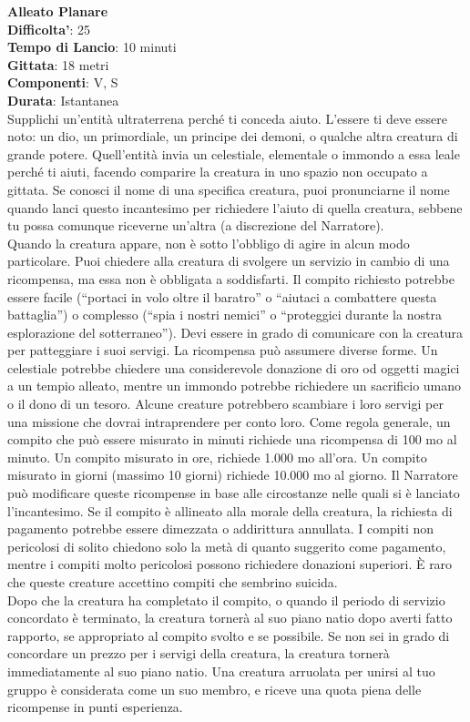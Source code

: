 \begin{multicols}{2}
\medskip\textbf{Alleato Planare}\\
\textbf{Difficolta'}: 25\\
\textbf{Tempo di Lancio}: 10 minuti\\
\textbf{Gittata}: 18 metri\\
\textbf{Componenti}: V, S\\
\textbf{Durata}: Istantanea\\
Supplichi un’entità ultraterrena perché ti conceda aiuto. L’essere ti deve essere noto: un dio, un primordiale, un principe dei demoni, o qualche altra creatura di grande potere. Quell’entità invia un celestiale, elementale o immondo a essa leale perché ti aiuti, facendo comparire la creatura in uno spazio non occupato a gittata. Se conosci il nome di una specifica creatura, puoi pronunciarne il nome quando lanci questo incantesimo per richiedere l’aiuto di quella creatura, sebbene tu possa comunque riceverne un’altra (a discrezione del Narratore).\\
Quando la creatura appare, non è sotto l’obbligo di agire in alcun modo particolare. Puoi chiedere alla creatura di svolgere un servizio in cambio di una ricompensa, ma essa non è obbligata a soddisfarti. Il compito richiesto potrebbe essere facile (“portaci in volo oltre il baratro” o “aiutaci a combattere questa battaglia”) o complesso (“spia i nostri nemici” o “proteggici durante la nostra esplorazione del sotterraneo”). Devi essere in grado di comunicare con la creatura per patteggiare i suoi servigi. La ricompensa può assumere diverse forme. Un celestiale potrebbe chiedere una considerevole donazione di oro od oggetti magici a un tempio alleato, mentre un immondo potrebbe richiedere un sacrificio umano o il dono di un tesoro. Alcune creature potrebbero scambiare i loro servigi per una missione che dovrai intraprendere per conto loro. Come regola generale, un compito che può essere misurato in minuti richiede una ricompensa di 100 mo al minuto. Un compito misurato in ore, richiede 1.000 mo all’ora. Un compito misurato in giorni (massimo 10 giorni) richiede 10.000 mo al giorno. Il Narratore può modificare queste ricompense in base alle circostanze nelle quali si è lanciato l’incantesimo. Se il compito è allineato alla morale della creatura, la richiesta di pagamento potrebbe essere dimezzata o addirittura annullata. I compiti non pericolosi di solito chiedono solo la metà di quanto suggerito come pagamento, mentre i compiti molto pericolosi possono richiedere donazioni superiori. È raro che queste creature accettino compiti che sembrino suicida.\\
Dopo che la creatura ha completato il compito, o quando il periodo di servizio concordato è terminato, la creatura tornerà al suo piano natio dopo averti fatto rapporto, se appropriato al compito svolto e se possibile. Se non sei in grado di concordare un prezzo per i servigi della creatura, la creatura tornerà immediatamente al suo piano natio. Una creatura arruolata per unirsi al tuo gruppo è considerata come un suo membro, e riceve una quota piena delle ricompense in punti esperienza.


\end{multicols}
